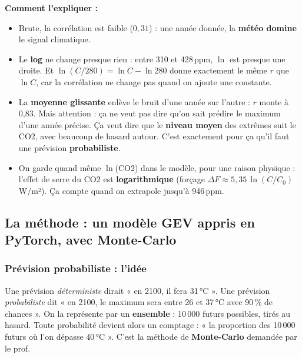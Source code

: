 \documentclass[11pt,a4paper]{article}
\begin{document}
\textbf{Comment l'expliquer :}
\begin{itemize}
  \item Brute, la corrélation est faible ($0{,}31$) : une année donnée, la \textbf{météo domine} le signal climatique.
  \item Le \textbf{log} ne change presque rien : entre 310 et 428\,ppm, $\ln$ est presque une droite. Et $\ln(C/280)=\ln C - \ln 280$ donne exactement le même $r$ que $\ln C$, car la corrélation ne change pas quand on ajoute une constante.
  \item La \textbf{moyenne glissante} enlève le bruit d'une année sur l'autre : $r$ monte à 0,83. Mais attention : ça ne veut pas dire qu'on sait prédire le maximum d'une année précise. Ça veut dire que le \textbf{niveau moyen} des extrêmes suit le CO2, avec beaucoup de hasard autour. C'est exactement pour ça qu'il faut une prévision \textbf{probabiliste}.
  \item On garde quand même $\ln$(CO2) dans le modèle, pour une raison physique : l'effet de serre du CO2 est \textbf{logarithmique} (forçage $\Delta F\approx 5{,}35\,\ln(C/C_0)$\,W/m²). Ça compte quand on extrapole jusqu'à 946\,ppm.
\end{itemize}

\subsection{La méthode : un modèle GEV appris en PyTorch, avec Monte-Carlo}\label{sec:methode}

\subsubsection*{Prévision probabiliste : l'idée}
Une prévision \emph{déterministe} dirait « en 2100, il fera 31\,°C ». Une prévision \emph{probabiliste} dit « en 2100, le maximum sera entre 26 et 37\,°C avec 90\,\% de chances ». On la représente par un \textbf{ensemble} : 10\,000 futurs possibles, tirés au hasard. Toute probabilité devient alors un comptage : « la proportion des 10\,000 futurs où l'on dépasse 40\,°C ». C'est la méthode de \textbf{Monte-Carlo} demandée par le prof.
\end{document}
